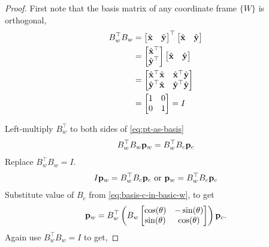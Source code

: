 \documentclass{article}
\begin{document}
\begin{proof}
  First note  that the basis matrix of any coordinate frame $\{W\}$ is
  orthogonal,
  \begin{align}
    B_w^\top B_w &= \begin{bmatrix}  \hat{\mathbf{x}} &  \hat{\mathbf{y}} \end{bmatrix}^\top
         \begin{bmatrix}  \hat{\mathbf{x}} &  \hat{\mathbf{y}} \end{bmatrix}
    \notag\\
    &=
    \begin{bmatrix}  \hat{\mathbf{x}}^\top \\  \hat{\mathbf{y}}^\top \end{bmatrix}
                                  \begin{bmatrix}  \hat{\mathbf{x}} &  \hat{\mathbf{y}} \end{bmatrix}
    \notag\\
    &=   \begin{bmatrix}  \hat{\mathbf{x}}^\top\hat{\mathbf{x}}  &   \hat{\mathbf{x}}^\top\hat{\mathbf{y}}
      \\  \hat{\mathbf{y}}^\top\hat{\mathbf{x}}  &  \hat{\mathbf{y}}^\top\hat{\mathbf{y}} \end{bmatrix}
    \notag\\
                 &=  \begin{bmatrix}
                   1 &  0  \\   0   &  1
                 \end{bmatrix} = I
  \end{align}

  Left-multiply $B_w^\top$ to both sides of \eqref{eq:pt-as-basis}
  \begin{align}
    B_w^\top  B_w \mathbf{p}_w = B_w^\top   B_c  \mathbf{p}_c
    \end{align}
    Replace $B_w^\top  B_w = I$.
    \begin{align}
      I \mathbf{p}_w = B_w^\top   B_c  \mathbf{p}_c
      \text{ or } \mathbf{p}_w = B_w^\top   B_c  \mathbf{p}_c
    \end{align}
    Substitute value  of $B_c$  from 
    \eqref{eq:basis-c-in-basic-w}, to get
    \begin{align}
      \mathbf{p}_w = B_w^\top   \left( B_w  \begin{bmatrix} \cos(\theta) &  -\sin(\theta) \\
        \sin(\theta) &   \cos(\theta) \end{bmatrix}   \right)\mathbf{p}_c.
    \end{align}
    Again  use $B_w^\top  B_w = I$ to get,


\end{proof}
\end{document}
